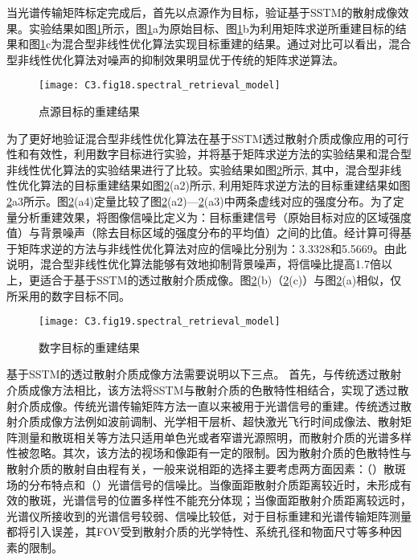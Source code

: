 当光谱传输矩阵标定完成后，首先以点源作为目标，验证基于SSTM的散射成像效果。实验结果如图\ref{fig:3.18}所示，图\ref{fig:3.18}a为原始目标、图\ref{fig:3.18}b为利用矩阵求逆所重建目标的结果和图\ref{fig:3.18}c为混合型非线性优化算法实现目标重建的结果。通过对比可以看出，混合型非线性优化算法对噪声的抑制效果明显优于传统的矩阵求逆算法。
\begin{figure}[htp]
	\centering
	\texttt{[image: C3.fig18.spectral\_retrieval\_model]}
	\caption{点源目标的重建结果}
	\label{fig:3.18}
\end{figure}

为了更好地验证混合型非线性优化算法在基于SSTM透过散射介质成像应用的可行性和有效性，利用数字目标进行实验，并将基于矩阵求逆方法的实验结果和混合型非线性优化算法的实验结果进行了比较。实验结果如图\ref{fig:3.19}所示, 其中，混合型非线性优化算法的目标重建结果如图\ref{fig:3.19}(a2)所示, 利用矩阵求逆方法的目标重建结果如图\ref{fig:3.19}a3所示。图\ref{fig:3.19}(a4)定量比较了图\ref{fig:3.19}(a2)—\ref{fig:3.19}(a3)中两条虚线对应的强度分布。为了定量分析重建效果，将图像信噪比定义为：目标重建信号（原始目标对应的区域强度值）与背景噪声（除去目标区域的强度分布的平均值）之间的比值。经计算可得基于矩阵求逆的方法与非线性优化算法对应的信噪比分别为：3.3328和5.5669。由此说明，混合型非线性优化算法能够有效地抑制背景噪声，将信噪比提高1.7倍以上，更适合于基于SSTM的透过散射介质成像。图\ref{fig:3.19}(b)（\ref{fig:3.19}(c)）与图\ref{fig:3.19}(a)相似，仅所采用的数字目标不同。

\begin{figure}[htp]
	\centering
	\texttt{[image: C3.fig19.spectral\_retrieval\_model]}
	\caption{数字目标的重建结果}
	\label{fig:3.19}
\end{figure}

基于SSTM的透过散射介质成像方法需要说明以下三点。 首先，与传统透过散射介质成像方法相比，该方法将SSTM与散射介质的色散特性相结合，实现了透过散射介质成像。传统光谱传输矩阵方法一直以来被用于光谱信号的重建。传统透过散射介质成像方法例如波前调制、光学相干层析、超快激光飞行时间成像法、散射矩阵测量和散斑相关等方法只适用单色光或者窄谱光源照明，而散射介质的光谱多样性被忽略。其次，该方法的视场和像距有一定的限制。因为散射介质的色散特性与散射介质的散射自由程有关，一般来说相距的选择主要考虑两方面因素：（）散斑场的分布特点和（）光谱信号的信噪比。当像面距散射介质距离较近时，未形成有效的散斑，光谱信号的位置多样性不能充分体现；当像面距散射介质距离较远时，光谱仪所接收到的光谱信号较弱、信噪比较低，对于目标重建和光谱传输矩阵测量都将引入误差，其FOV受到散射介质的光学特性、系统孔径和物面尺寸等多种因素的限制。

